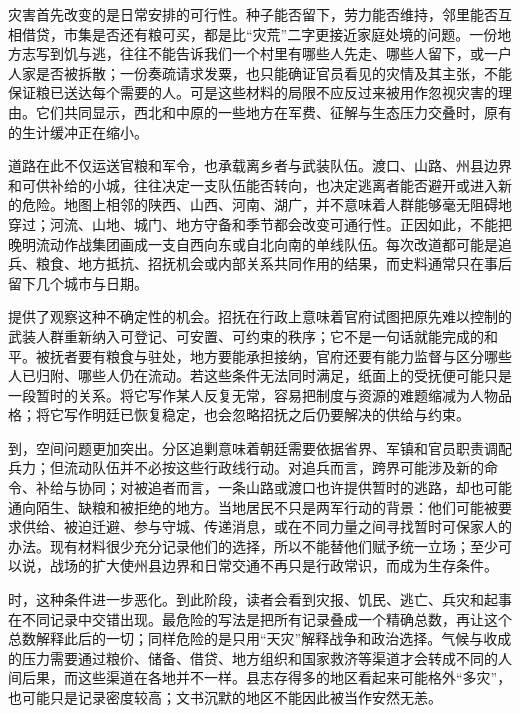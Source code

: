 灾害首先改变的是日常安排的可行性。种子能否留下，劳力能否维持，邻里能否互相借贷，市集是否还有粮可买，都是比“灾荒”二字更接近家庭处境的问题。一份地方志写到饥与逃，往往不能告诉我们一个村里有哪些人先走、哪些人留下，或一户人家是否被拆散；一份奏疏请求发粟，也只能确证官员看见的灾情及其主张，不能保证粮已送达每个需要的人。可是这些材料的局限不应反过来被用作忽视灾害的理由。它们共同显示，西北和中原的一些地方在军费、征解与生态压力交叠时，原有的生计缓冲正在缩小。

道路在此不仅运送官粮和军令，也承载离乡者与武装队伍。渡口、山路、州县边界和可供补给的小城，往往决定一支队伍能否转向，也决定逃离者能否避开或进入新的危险。地图上相邻的陕西、山西、河南、湖广，并不意味着人群能够毫无阻碍地穿过；河流、山地、城门、地方守备和季节都会改变可通行性。正因如此，不能把晚明流动作战集团画成一支自西向东或自北向南的单线队伍。每次改道都可能是追兵、粮食、地方抵抗、招抚机会或内部关系共同作用的结果，而史料通常只在事后留下几个城市与日期。

提供了观察这种不确定性的机会。招抚在行政上意味着官府试图把原先难以控制的武装人群重新纳入可登记、可安置、可约束的秩序；它不是一句话就能完成的和平。被抚者要有粮食与驻处，地方要能承担接纳，官府还要有能力监督与区分哪些人已归附、哪些人仍在流动。若这些条件无法同时满足，纸面上的受抚便可能只是一段暂时的关系。将它写作某人反复无常，容易把制度与资源的难题缩减为人物品格；将它写作明廷已恢复稳定，也会忽略招抚之后仍要解决的供给与约束。

到，空间问题更加突出。分区追剿意味着朝廷需要依据省界、军镇和官员职责调配兵力；但流动队伍并不必按这些行政线行动。对追兵而言，跨界可能涉及新的命令、补给与协同；对被追者而言，一条山路或渡口也许提供暂时的逃路，却也可能通向陌生、缺粮和被拒绝的地方。当地居民不只是两军行动的背景：他们可能被要求供给、被迫迁避、参与守城、传递消息，或在不同力量之间寻找暂时可保家人的办法。现有材料很少充分记录他们的选择，所以不能替他们赋予统一立场；至少可以说，战场的扩大使州县边界和日常交通不再只是行政常识，而成为生存条件。

时，这种条件进一步恶化。到此阶段，读者会看到灾报、饥民、逃亡、兵灾和起事在不同记录中交错出现。最危险的写法是把所有记录叠成一个精确总数，再让这个总数解释此后的一切；同样危险的是只用“天灾”解释战争和政治选择。气候与收成的压力需要通过粮价、储备、借贷、地方组织和国家救济等渠道才会转成不同的人间后果，而这些渠道在各地并不一样。县志存得多的地区看起来可能格外“多灾”，也可能只是记录密度较高；文书沉默的地区不能因此被当作安然无恙。

